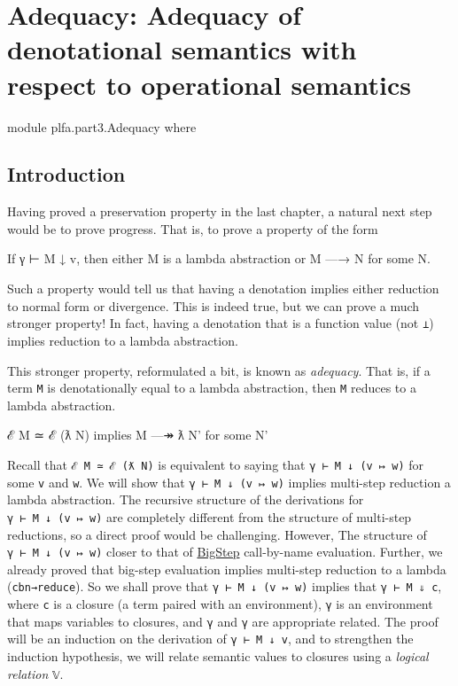 \hypertarget{Adequacy}{%
\chapter{Adequacy: Adequacy of denotational semantics with respect to
operational semantics}\label{Adequacy}}

\begin{fence}
\begin{code}
module plfa.part3.Adequacy where
\end{code}
\end{fence}

\hypertarget{introduction}{%
\section{Introduction}\label{introduction}}

Having proved a preservation property in the last chapter, a natural
next step would be to prove progress. That is, to prove a property of
the form

\begin{myDisplay}
If γ ⊢ M ↓ v, then either M is a lambda abstraction or M —→ N for some N.
\end{myDisplay}

Such a property would tell us that having a denotation implies either
reduction to normal form or divergence. This is indeed true, but we can
prove a much stronger property! In fact, having a denotation that is a
function value (not \texttt{⊥}) implies reduction to a lambda
abstraction.

This stronger property, reformulated a bit, is known as \emph{adequacy}.
That is, if a term \texttt{M} is denotationally equal to a lambda
abstraction, then \texttt{M} reduces to a lambda abstraction.

\begin{myDisplay}
ℰ M ≃ ℰ (ƛ N)  implies M —↠ ƛ N' for some N'
\end{myDisplay}

Recall that \texttt{ℰ\ M\ ≃\ ℰ\ (ƛ\ N)} is equivalent to saying that
\texttt{γ\ ⊢\ M\ ↓\ (v\ ↦\ w)} for some \texttt{v} and \texttt{w}. We
will show that \texttt{γ\ ⊢\ M\ ↓\ (v\ ↦\ w)} implies multi-step
reduction a lambda abstraction. The recursive structure of the
derivations for \texttt{γ\ ⊢\ M\ ↓\ (v\ ↦\ w)} are completely different
from the structure of multi-step reductions, so a direct proof would be
challenging. However, The structure of \texttt{γ\ ⊢\ M\ ↓\ (v\ ↦\ w)}
closer to that of \protect\hyperlink{BigStep}{BigStep} call-by-name
evaluation. Further, we already proved that big-step evaluation implies
multi-step reduction to a lambda (\texttt{cbn→reduce}). So we shall
prove that \texttt{γ\ ⊢\ M\ ↓\ (v\ ↦\ w)} implies that
\texttt{γ\textquotesingle{}\ ⊢\ M\ ⇓\ c}, where \texttt{c} is a closure
(a term paired with an environment), \texttt{γ\textquotesingle{}} is an
environment that maps variables to closures, and \texttt{γ} and
\texttt{γ\textquotesingle{}} are appropriate related. The proof will be
an induction on the derivation of \texttt{γ\ ⊢\ M\ ↓\ v}, and to
strengthen the induction hypothesis, we will relate semantic values to
closures using a \emph{logical relation} \texttt{𝕍}.

